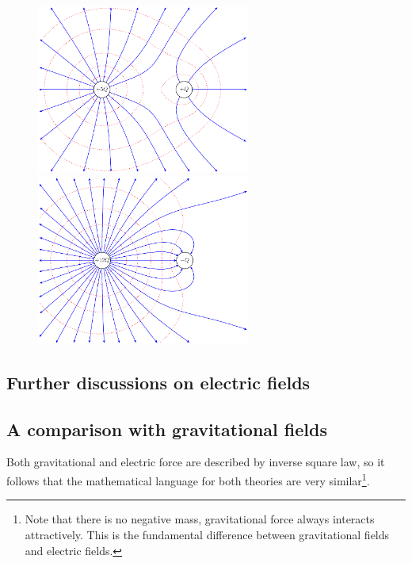 \begin{figure}	
	\noindent\begin{minipage}{0.48\textwidth}	
		\begin{center}	
			\includegraphics[width=7cm]{Q5p.pdf}
		\end{center}
	\end{minipage}\hfill
	\begin{minipage}{0.48\textwidth}
		\begin{center}
			\includegraphics[width=7cm]{Q12n.pdf}
		\end{center}	
	\end{minipage}
\end{figure}



\subsection{Further discussions on electric fields}

\subsection{A comparison with gravitational fields}

Both gravitational and electric force are described by inverse square law, so it follows that the mathematical language for both theories are very similar\footnote{Note that there is no negative mass, gravitational force always interacts attractively. This is the fundamental difference between gravitational fields and electric fields.}.


